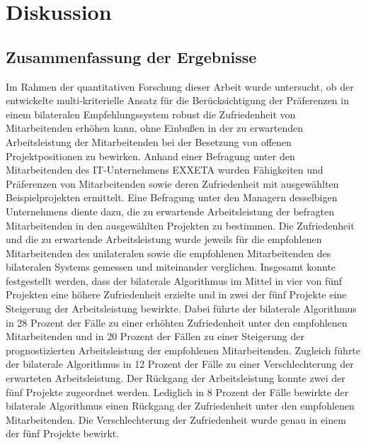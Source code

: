 
\chapter{Diskussion}
\label{ch:diskussion}

\section{Zusammenfassung der Ergebnisse}
Im Rahmen der quantitativen Forschung dieser Arbeit wurde untersucht, ob der entwickelte multi-kriterielle Ansatz für die Berücksichtigung der Präferenzen in einem bilateralen Empfehlungssystem robust die Zufriedenheit von Mitarbeitenden erhöhen kann, ohne Einbußen in der zu erwartenden Arbeitsleistung der Mitarbeitenden bei der Besetzung von offenen Projektpositionen zu bewirken.
Anhand einer Befragung unter den Mitarbeitenden des IT-Unternehmens EXXETA wurden Fähigkeiten und Präferenzen von Mitarbeitenden sowie deren Zufriedenheit mit ausgewählten Beispielprojekten ermittelt.
Eine Befragung unter den Managern desselbigen Unternehmens diente dazu, die zu erwartende Arbeitsleistung der befragten Mitarbeitenden in den ausgewählten Projekten zu bestimmen.
Die Zufriedenheit und die zu erwartende Arbeitsleistung wurde jeweils für die empfohlenen Mitarbeitenden des unilateralen sowie die empfohlenen Mitarbeitenden des bilateralen Systems gemessen und miteinander verglichen.
Insgesamt konnte festgestellt werden, dass der bilaterale Algorithmus im Mittel in vier von fünf Projekten eine höhere Zufriedenheit erzielte und in zwei der fünf Projekte eine Steigerung der Arbeitsleistung bewirkte.
Dabei führte der bilaterale Algorithmus in 28 Prozent der Fälle zu einer erhöhten Zufriedenheit unter den empfohlenen Mitarbeitenden und in 20 Prozent der Fällen zu einer Steigerung der prognostizierten Arbeitsleistung der empfohlenen Mitarbeitenden.
Zugleich führte der bilaterale Algorithmus in 12 Prozent der Fälle zu einer Verschlechterung der erwarteten Arbeitsleistung.
Der Rückgang der Arbeitsleistung konnte zwei der fünf Projekte zugeordnet werden.
Lediglich in 8 Prozent der Fälle bewirkte der bilaterale Algorithmus einen Rückgang der Zufriedenheit unter den empfohlenen Mitarbeitenden.
Die Verschlechterung der Zufriedenheit wurde genau in einem der fünf Projekte bewirkt.


